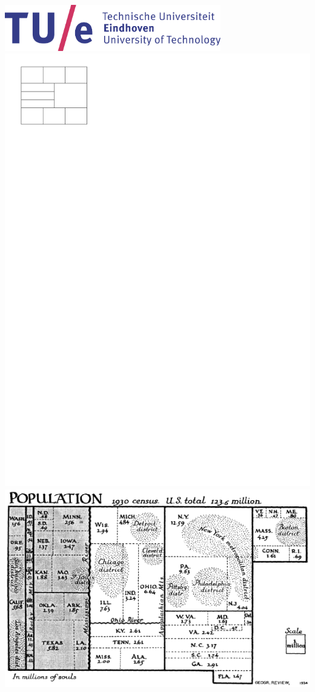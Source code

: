 \documentclass[a4paper]{article}
\begin{document}
\includegraphics[height=2cm]{tue-logo-high}
\clearpage%
\includegraphics{./titleimage.pdf}
\clearpage%
\setcounter{tocdepth}{2}
\setcounter{page}{0}
\includegraphics[scale=.8]{./introduction/img/cartogram.png}
\end{document}
